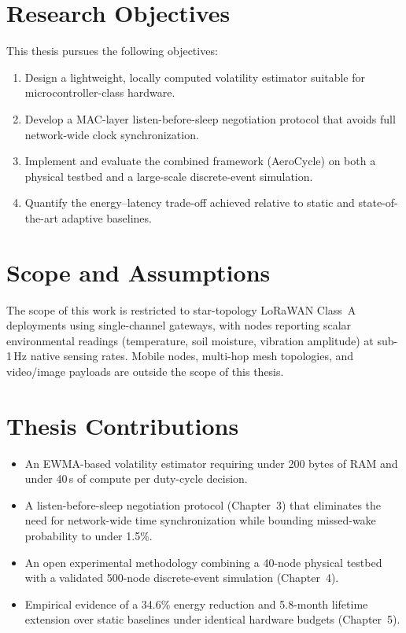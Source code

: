 \documentclass[12pt,a4paper]{report}
\begin{document}
\section{Research Objectives}
This thesis pursues the following objectives:
\begin{enumerate}[label=\textbf{O\arabic*.}, leftmargin=2.2em]
  \item Design a lightweight, locally computed volatility estimator suitable for
        microcontroller-class hardware.
  \item Develop a MAC-layer listen-before-sleep negotiation protocol that avoids full
        network-wide clock synchronization.
  \item Implement and evaluate the combined framework (AeroCycle) on both a physical testbed
        and a large-scale discrete-event simulation.
  \item Quantify the energy--latency trade-off achieved relative to static and
        state-of-the-art adaptive baselines.
\end{enumerate}

\section{Scope and Assumptions}
The scope of this work is restricted to star-topology LoRaWAN Class~A deployments using
single-channel gateways, with nodes reporting scalar environmental readings (temperature,
soil moisture, vibration amplitude) at sub-1\,Hz native sensing rates. Mobile nodes,
multi-hop mesh topologies, and video/image payloads are outside the scope of this thesis.

\section{Thesis Contributions}
\begin{itemize}[leftmargin=1.4em]
  \item An EWMA-based volatility estimator requiring under 200 bytes of RAM and under
        40\,\textmu s of compute per duty-cycle decision.
  \item A listen-before-sleep negotiation protocol (Chapter~3) that eliminates the need for
        network-wide time synchronization while bounding missed-wake probability to
        under 1.5\%.
  \item An open experimental methodology combining a 40-node physical testbed with a
        validated 500-node discrete-event simulation (Chapter~4).
  \item Empirical evidence of a 34.6\% energy reduction and 5.8-month lifetime extension
        over static baselines under identical hardware budgets (Chapter~5).
\end{itemize}
\end{document}
